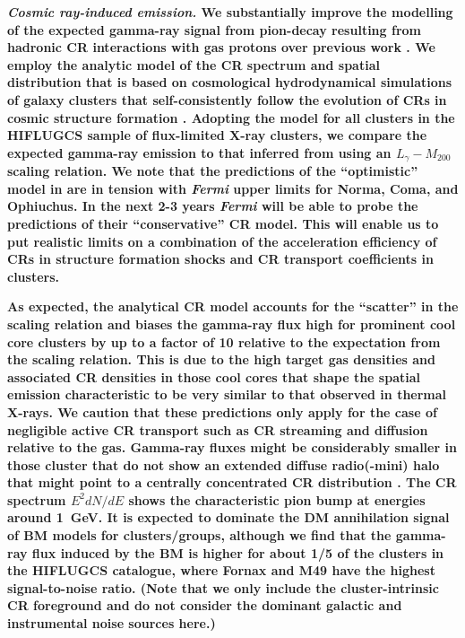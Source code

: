 \documentclass[10pt,aps,pra,reprint,amsmath,amsfonts,amssymb,showpacs,nofootinbib,floatfix]{revtex4-1}
\def\del#1{{}}
\def\C#1{{\bf #1}}
\newcommand{\Fermi}{{\em Fermi}\xspace}
\newcommand{\mvir}{M_{200}}
\begin{document}
\C{{\em Cosmic ray-induced emission.} We substantially improve the
  modelling of the expected gamma-ray signal from pion-decay resulting
  from hadronic CR interactions with gas protons over previous work
  \cite{2010ApJ...717L..71A}. We employ the analytic model of the CR
  spectrum and spatial distribution that is based on cosmological
  hydrodynamical simulations of galaxy clusters that self-consistently
  follow the evolution of CRs in cosmic structure formation
  \cite{2010MNRAS.409..449P}. Adopting the model for all clusters in
  the HIFLUGCS sample of flux-limited X-ray clusters, we compare the
  expected gamma-ray emission to that inferred from using an
  $L_\gamma-\mvir$ scaling relation. We note that the predictions of
  the ``optimistic'' model in \cite{2010MNRAS.409..449P} are in
  tension with \Fermi upper limits for Norma, Coma, and Ophiuchus. In
  the next 2-3 years \Fermi will be able to probe the predictions of
  their ``conservative'' CR model. This will enable us to put
  realistic limits on a combination of the acceleration efficiency of
  CRs in structure formation shocks and CR transport coefficients in
  clusters.}

\C{As expected, the analytical CR model accounts for the ``scatter''
  in the scaling relation and biases the gamma-ray flux high for
  prominent cool core clusters by up to a factor of 10 relative to the
  expectation from the scaling relation. This is due to the high
  target gas densities and associated CR densities in those cool cores
  that shape the spatial emission characteristic to be very similar to
  that observed in thermal X-rays. We caution that these predictions
  only apply for the case of negligible active CR transport such as CR
  streaming and diffusion relative to the gas. Gamma-ray fluxes might
  be considerably smaller in those cluster that do not show an
  extended diffuse radio(-mini) halo that might point to a centrally
  concentrated CR distribution \cite{2011A&A...527A..99E}. The CR
  spectrum $E^2 dN/dE$ shows the characteristic pion bump at energies
  around 1~GeV. It is expected to dominate the DM annihilation signal
  of BM models for clusters/groups, although we find that the
  gamma-ray flux induced by the BM is higher for about 1/5 of the
  clusters in the HIFLUGCS catalogue, where Fornax and M49 have the
  highest signal-to-noise ratio. (Note that we only include the
  cluster-intrinsic CR foreground and do not consider the dominant
  galactic and instrumental noise sources here.)}

\del{ We find that
  \Fermi-LAT will be able to start constraining these DM models within
  five years using clusters of galaxies.}
\end{document}
